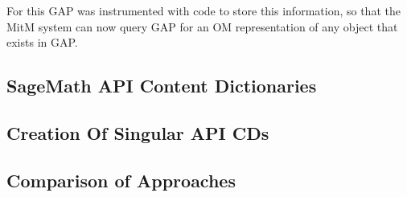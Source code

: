 For this GAP was instrumented with code to store this information, so that the MitM system can now query GAP for an OM representation of any object that exists in GAP.

\subsection{SageMath API Content Dictionaries}

\subsection{Creation Of Singular API CDs}
\subsection{Comparison of Approaches}

